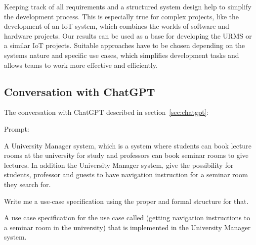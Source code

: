 \documentclass[conference,onecolumn]{IEEEtran}
\begin{document}
Keeping track of all requirements and a structured system design help to simplify the development process. This is especially true for complex projects, like the development of an IoT system, which combines the worlds of software and hardware projects.
Our results can be used as a base for developing the URMS or a similar IoT projects. Suitable approaches have to be chosen depending on the systems nature and specific use cases, which simplifies development tasks and allows teams to work more effective and efficiently.

\newpage



\newpage
\appendix

\subsection{Conversation with ChatGPT} \label{appdx:chatgpt}
 
The conversation with ChatGPT described in section~\ref{sec:chatgpt}:

Prompt:
\begin{framed}
	\small
	A University Manager system, which is a system where students can book lecture rooms at the university for study and professors can book seminar rooms to give lectures. In addition the University Manager system, give the possibility for students, professor and guests  to have navigation instruction for a seminar room they search for.
	
	Write me a use-case specification using the proper and formal structure for that.
	
	A use case specification for the use case called (getting navigation instructions to a seminar room in the university) that is implemented in the University Manager system.
\end{framed}
\end{document}
